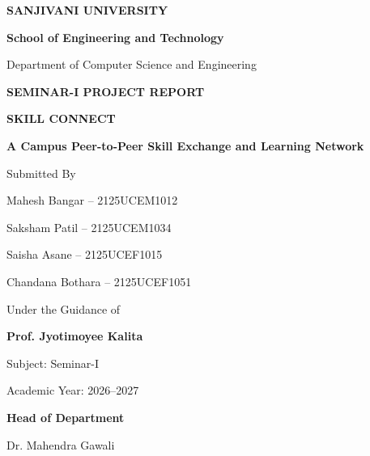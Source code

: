 \documentclass[12pt,a4paper]{report}
\newcommand{\ProjectTitle}{SKILL CONNECT}
\newcommand{\ProjectSubtitle}{A Campus Peer-to-Peer Skill Exchange and Learning Network}
\newcommand{\UniversityName}{SANJIVANI UNIVERSITY}
\newcommand{\SchoolName}{School of Engineering and Technology}
\newcommand{\DepartmentName}{Department of Computer Science and Engineering}
\newcommand{\StudentOne}{Mahesh Bangar -- 2125UCEM1012}
\newcommand{\StudentTwo}{Saksham Patil -- 2125UCEM1034}
\newcommand{\StudentThree}{Saisha Asane -- 2125UCEF1015}
\newcommand{\StudentFour}{Chandana Bothara -- 2125UCEF1051}
\newcommand{\GuideName}{Prof. Jyotimoyee Kalita}
\newcommand{\HODName}{Dr. Mahendra Gawali}
\newcommand{\AcademicYear}{2026--2027}
\begin{document}

\begin{titlepage}
\thispagestyle{empty}
\centering

{\textbf{\LARGE \UniversityName}\par}
\vspace{0.25cm}
{\textbf{\large \SchoolName}\par}
\vspace{0.15cm}
{\DepartmentName\par}

\vfill
{\textbf{\large SEMINAR-I PROJECT REPORT}\par}

\vfill
{\textbf{\huge \ProjectTitle}\par}
\vspace{0.35cm}
{\textbf{\large \ProjectSubtitle}\par}

\vfill
{\small Submitted By\par}
\vspace{0.35cm}
{\StudentOne\par}
\vspace{0.15cm}
{\StudentTwo\par}
\vspace{0.15cm}
{\StudentThree\par}
\vspace{0.15cm}
{\StudentFour\par}

\vfill
{\small Under the Guidance of\par}
\vspace{0.35cm}
{\textbf{\large \GuideName}\par}

\vfill
{Subject: Seminar-I\par}
\vspace{0.15cm}
{Academic Year: \AcademicYear\par}

\vspace{0.8cm}
{\textbf{Head of Department}\par}
\vspace{0.15cm}
{\HODName\par}

\end{titlepage}
\end{document}
